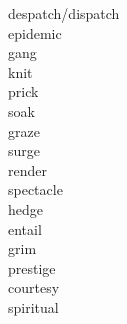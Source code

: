\documentclass[a4paper, 11pt]{ctexart}
\begin{document}
\begin{multicols*}{3}
\begin{description}
\item[despatch/dispatch]

\item[epidemic]

\item[gang]

\item[knit]

\item[prick]

\item[soak]

\item[graze]

\item[surge]

\item[render]

\item[spectacle]

\item[hedge]

\item[entail]

\item[grim]

\item[prestige]

\item[courtesy]

\item[spiritual]

    \end{description}
\end{multicols*}
\end{document}
